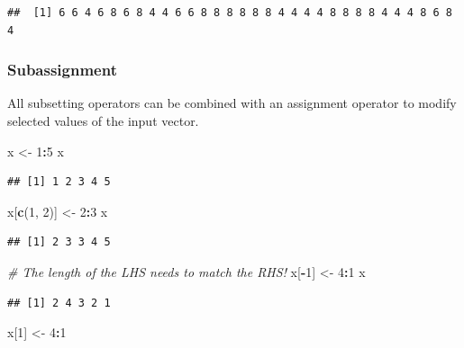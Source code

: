 \documentclass[
]{book}
\newenvironment{Shaded}{\begin{snugshade}}{\end{snugshade}}
\newcommand{\CommentTok}[1]{\textcolor[rgb]{0.56,0.35,0.01}{\textit{#1}}}
\newcommand{\DecValTok}[1]{\textcolor[rgb]{0.00,0.00,0.81}{#1}}
\newcommand{\FunctionTok}[1]{\textcolor[rgb]{0.13,0.29,0.53}{\textbf{#1}}}
\newcommand{\NormalTok}[1]{#1}
\newcommand{\OtherTok}[1]{\textcolor[rgb]{0.56,0.35,0.01}{#1}}
\newcommand{\SpecialCharTok}[1]{\textcolor[rgb]{0.81,0.36,0.00}{\textbf{#1}}}
\begin{document}
\begin{verbatim}
##  [1] 6 6 4 6 8 6 8 4 4 6 6 8 8 8 8 8 8 4 4 4 4 8 8 8 8 4 4 4 8 6 8 4
\end{verbatim}

\subsubsection{Subassignment}\label{subassignment}

All subsetting operators can be combined with an assignment operator to modify selected values of the input vector.

\begin{Shaded}
\begin{Highlighting}[]
\NormalTok{x }\OtherTok{\textless{}{-}} \DecValTok{1}\SpecialCharTok{:}\DecValTok{5}
\NormalTok{x}
\end{Highlighting}
\end{Shaded}

\begin{verbatim}
## [1] 1 2 3 4 5
\end{verbatim}

\begin{Shaded}
\begin{Highlighting}[]
\NormalTok{x[}\FunctionTok{c}\NormalTok{(}\DecValTok{1}\NormalTok{, }\DecValTok{2}\NormalTok{)] }\OtherTok{\textless{}{-}} \DecValTok{2}\SpecialCharTok{:}\DecValTok{3}
\NormalTok{x}
\end{Highlighting}
\end{Shaded}

\begin{verbatim}
## [1] 2 3 3 4 5
\end{verbatim}

\begin{Shaded}
\begin{Highlighting}[]
\CommentTok{\# The length of the LHS needs to match the RHS!}
\NormalTok{x[}\SpecialCharTok{{-}}\DecValTok{1}\NormalTok{] }\OtherTok{\textless{}{-}} \DecValTok{4}\SpecialCharTok{:}\DecValTok{1}
\NormalTok{x}
\end{Highlighting}
\end{Shaded}

\begin{verbatim}
## [1] 2 4 3 2 1
\end{verbatim}

\begin{Shaded}
\begin{Highlighting}[]
\NormalTok{x[}\DecValTok{1}\NormalTok{] }\OtherTok{\textless{}{-}} \DecValTok{4}\SpecialCharTok{:}\DecValTok{1}
\end{Highlighting}
\end{Shaded}
\end{document}
